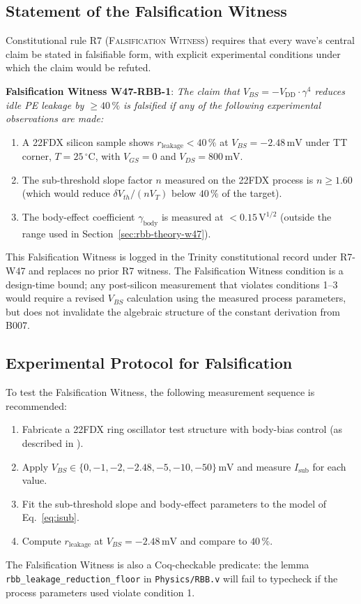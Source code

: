 \subsection{Statement of the Falsification Witness}

Constitutional rule R7 (\textsc{Falsification Witness}) requires that every
wave's central claim be stated in falsifiable form, with explicit experimental
conditions under which the claim would be refuted.

\textbf{Falsification Witness W47-RBB-1}:
\textit{The claim that $V_{BS} = -V_{\mathrm{DD}} \cdot \gamma^{4}$ reduces
idle PE leakage by $\geq 40\,\%$ is falsified if any of the following
experimental observations are made:}
\begin{enumerate}
  \item A 22FDX silicon sample shows $r_{\mathrm{leakage}} < 40\,\%$ at
    $V_{BS} = -2.48\,\text{mV}$ under TT corner, $T = 25\,{}^\circ\text{C}$,
    with $V_{GS} = 0$ and $V_{DS} = 800\,\text{mV}$.
  \item The sub-threshold slope factor $n$ measured on the 22FDX process is
    $n \geq 1.60$ (which would reduce $\delta V_{th}/(n V_T)$ below $40\,\%$
    of the target).
  \item The body-effect coefficient $\gamma_{\mathrm{body}}$ is measured at
    $< 0.15\,\text{V}^{1/2}$ (outside the range used in
    Section~\ref{sec:rbb-theory-w47}).
\end{enumerate}

This Falsification Witness is logged in the Trinity constitutional record
under R7-W47 and replaces no prior R7 witness.
The Falsification Witness condition is a design-time bound; any post-silicon
measurement that violates conditions 1--3 would require a revised $V_{BS}$
calculation using the measured process parameters, but does not invalidate the
algebraic structure of the constant derivation from B007.

\subsection{Experimental Protocol for Falsification}

To test the Falsification Witness, the following measurement sequence is
recommended:
\begin{enumerate}
  \item Fabricate a 22FDX ring oscillator test structure with body-bias
    control (as described in \citep{tschanz_jssc_2002}).
  \item Apply $V_{BS} \in \{0, -1, -2, -2.48, -5, -10, -50\}\,\text{mV}$
    and measure $I_{\mathrm{sub}}$ for each value.
  \item Fit the sub-threshold slope and body-effect parameters to the
    model of Eq.~\eqref{eq:isub}.
  \item Compute $r_{\mathrm{leakage}}$ at $V_{BS} = -2.48\,\text{mV}$ and
    compare to $40\,\%$.
\end{enumerate}
The Falsification Witness is also a Coq-checkable predicate: the lemma
\texttt{rbb\_leakage\_reduction\_floor} in \texttt{Physics/RBB.v} will fail
to typecheck if the process parameters used violate condition 1.

